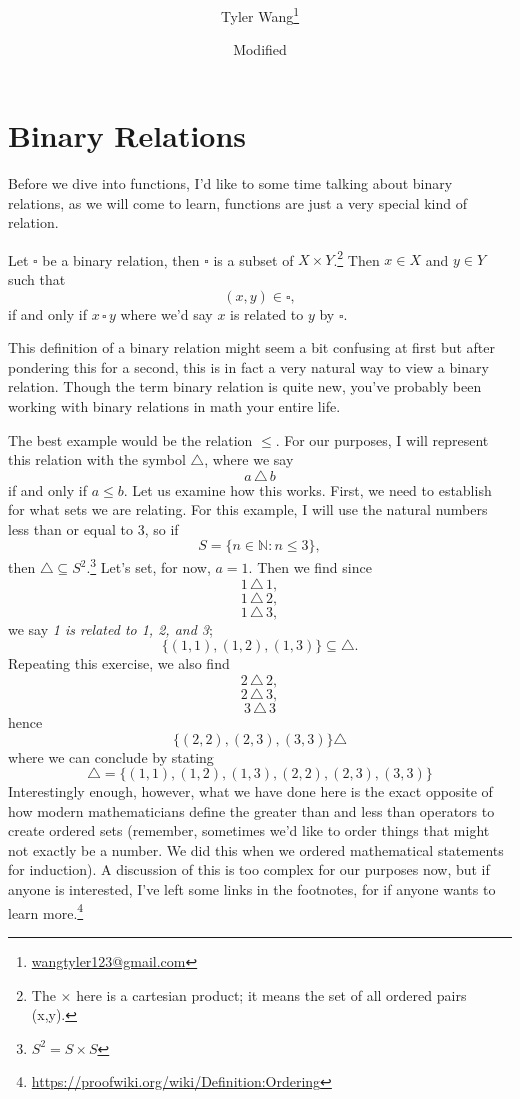 \documentclass[11pt]{article}
\title{\mytitle \\ [2ex] \Large \mysubtitle}
\date{\small Modified \mydate}
\author {Tyler Wang\thanks{
\href{mailto:wangtyler123@gmail.com}{wangtyler123@gmail.com}}}
\numberwithin{lemma}{section}
\numberwithin{equation}{section}
\numberwithin{define}{section}
\numberwithin{prop}{section}
\numberwithin{figure}{section}
\numberwithin{theorem}{section}
\newcounter{ex}[section]
\numberwithin{ex}{section}
\def\nat{\mathbb{N}}
\begin{document}
\maketitle
\section{Binary Relations}
Before we dive into functions, I'd like to some time talking about binary relations, as we will come to learn, functions are just a very special kind of relation. 
\begin{define}
	Let $\square$ be a binary relation, then $\square$ is a subset of $X \times Y$.\footnote{The $\times$ here is a cartesian product; it means the set of all ordered pairs (x,y).} 
	Then $x\in X$ and $y\in Y$ such that
	$$(x,y)\in \square,$$
	if and only if $x \,\square\, y$ where we'd say $x$ is related to $y$ by $\square$.
\end{define}

This definition of a binary relation might seem a bit confusing at first but after pondering this for a second, this is in fact a very natural way to view a binary relation. 
Though the term binary relation is quite new, you've probably been working with binary relations in math your entire life. 

The best example would be the relation $\le$. For our purposes, I will represent this relation with the symbol $\triangle$, where we say
$$a \,\triangle\, b$$
if and only if $a\le b$.
Let us examine how this works. First, we need to establish for what sets we are relating. For this example, I will use the natural numbers less than or equal to 3, so if
$$S=\{n\in\nat : n \le 3\},$$
then $\triangle \subseteq S^2$.\footnote{$S^2=S\times S$}
Let's set, for now, $a=1$. Then we find since 
$$1 \,\triangle\,1,$$
$$1 \,\triangle\,2,$$
$$1 \,\triangle\,3,$$
we say \textit{1 is related to 1, 2, and 3}; 
$$\{(1,1),(1,2),(1,3)\}\subseteq \triangle.$$
Repeating this exercise, we also find
$$2 \,\triangle\,2,$$
$$2 \,\triangle\,3,$$
$$3 \,\triangle\,3$$
hence
$$\{(2,2),(2,3),(3,3)\} \triangle$$
where we can conclude by stating
$$\triangle=\{(1,1),(1,2),(1,3),(2,2),(2,3),(3,3)\}$$
Interestingly enough, however, what we have done here is the exact opposite of how modern mathematicians define the greater than and less than operators to create ordered sets 
(remember, sometimes we'd like to order things that might not exactly be a number. We did this when we ordered mathematical statements for induction). 
A discussion of this is too complex for our purposes now, but if anyone is interested, I've left some links in the footnotes, for if anyone wants to learn more.\footnote{\href{https://proofwiki.org/wiki/Definition:Ordering}{https://proofwiki.org/wiki/Definition:Ordering}}
\end{document}
